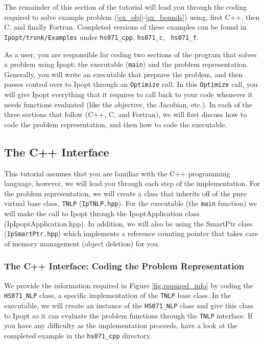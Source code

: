 \documentclass[letter,10pt]{article}
\begin{document}
{%

The remainder of this section of the tutorial will lead you through
the coding required to solve example problem
(\ref{ex_obj}-\ref{ex_bounds}) using, first C++, then C, and finally
Fortran. Completed versions of these examples can be found in {\tt
Ipopt/trunk/Examples} under {\tt hs071\_cpp}, {\tt hs071\_c}, {\tt
hs071\_f}.

As a user, you are responsible for coding two sections of the program
that solves a problem using Ipopt: the executable ({\tt main}) and the
problem representation.  Generally, you will write an executable that
prepares the problem, and then passes control over to Ipopt through an
{\tt Optimize} call. In this {\tt Optimize} call, you will give Ipopt
everything that it requires to call back to your code whenever it
needs functions evaluated (like the objective, the Jacobian, etc.).
In each of the three sections that follow (C++, C, and Fortran), we
will first discuss how to code the problem representation, and then
how to code the executable.

\subsection{The C++ Interface}
This tutorial assumes that you are familiar with the C++ programming
language, however, we will lead you through each step of the
implementation. For the problem representation, we will create a class
that inherits off of the pure virtual base class, {\tt TNLP}
({\tt IpTNLP.hpp}). For the executable (the {\tt main} function) we will
make the call to Ipopt through the IpoptApplication class
(IpIpoptApplication.hpp). In addition, we will also be using the
SmartPtr class ({\tt IpSmartPtr.hpp}) which implements a reference counting
pointer that takes care of memory management (object deletion) for
you.

\subsubsection{The C++ Interface: Coding the Problem Representation}
We provide the information required in Figure \ref{fig.required_info}
by coding the {\tt HS071\_NLP} class, a specific implementation of the
{\tt TNLP} base class. In the executable, we will create an instance
of the {\tt HS071\_NLP} class and give this class to Ipopt so it can
evaluate the problem functions through the {\tt TNLP} interface. If
you have any difficulty as the implementation proceeds, have a look at
the completed example in the {\tt hs071\_cpp} directory.

}
\end{document}

